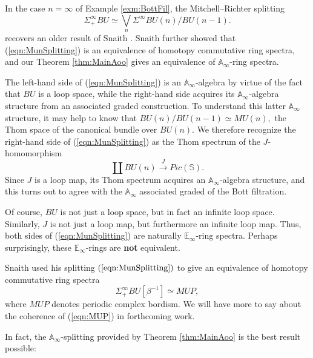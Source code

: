 \begin{exm} \label{exm:Thom}
In the case $n=\infty$ of Example \ref{exm:BottFil}, the Mitchell--Richter splitting
\begin{equation} \label{eqn:MunSplitting}
\Sigma^{\infty}_+ BU \simeq \bigvee_n \Sigma^{\infty} BU(n)/BU(n-1).
\end{equation}
recovers an older result of Snaith \cite{SnaithBook}.  Snaith further showed that (\ref{eqn:MunSplitting}) is an equivalence of homotopy commutative ring spectra, and our Theorem \ref{thm:MainAoo} gives an equivalence of $\mathbb{A}_\infty$-ring spectra.
 
The left-hand side of (\ref{eqn:MunSplitting}) is an $\mathbb{A}_\infty$-algebra by virtue of the fact that $BU$ is a loop space, while the right-hand side acquires its $\mathbb{A}_\infty$-algebra structure from an associated graded construction. To understand this latter $\mathbb{A}_\infty$ structure, it may help to know that $BU(n)/BU(n-1) \simeq MU(n),$ the Thom space of the canonical bundle over $BU(n)$.  We therefore recognize the right-hand side of (\ref{eqn:MunSplitting}) as the Thom spectrum of the $J$-homomorphism
$$\coprod BU(n) \stackrel{J}{\longrightarrow} Pic(\mathbb{S}).$$
Since $J$ is a loop map, its Thom spectrum acquires an $\mathbb{A}_\infty$-algebra structure, and this turns out to agree with the $\mathbb{A}_\infty$ associated graded of the Bott filtration.

Of course, $BU$ is not just a loop space, but in fact an infinite loop space.  Similarly, $J$ is not just a loop map, but furthermore an infinite loop map.  Thus, both sides of (\ref{eqn:MunSplitting}) are naturally $\mathbb{E}_\infty$-ring spectra.  Perhaps surprisingly, these $\mathbb{E}_\infty$-rings are \textbf{not} equivalent.
\end{exm}

\begin{rmk}
Snaith used his splitting $(\ref{eqn:MunSplitting})$ to give an equivalence of homotopy commutative ring spectra
\begin{equation}
\Sigma^{\infty}_+ BU[\beta^{-1}] \simeq MUP, \label{eqn:MUP}
\end{equation}
where $MUP$ denotes periodic complex bordism.  We will have more to say about the coherence of (\ref{eqn:MUP}) in forthcoming work.
\end{rmk}

In fact, the $\mathbb{A}_\infty$-splitting provided by Theorem \ref{thm:MainAoo} is the best result possible:

